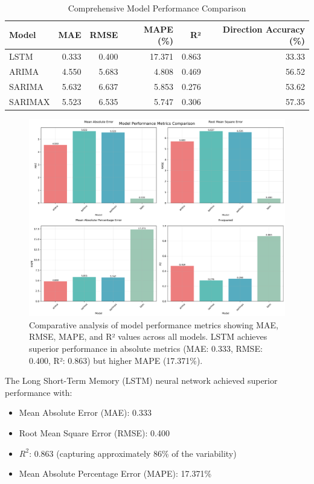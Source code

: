 \documentclass[12pt,a4paper]{report}
\begin{document}
\begin{table}[htbp]
\centering
\caption{Comprehensive Model Performance Comparison}
\label{tab:model_performance}
\begin{tabular}{lrrrrr}
\toprule
Model & MAE & RMSE & MAPE (\%) & R² & Direction Accuracy (\%) \\
\midrule
LSTM & 0.333 & 0.400 & 17.371 & 0.863 & 33.33 \\
ARIMA & 4.550 & 5.683 & 4.808 & 0.469 & 56.52 \\
SARIMA & 5.632 & 6.637 & 5.853 & 0.276 & 53.62 \\
SARIMAX & 5.523 & 6.535 & 5.747 & 0.306 & 57.35 \\
\bottomrule
\end{tabular}
\end{table}

\begin{figure}[htbp]
    \centering
    \includegraphics[width=\textwidth]{model_metrics_comparison}
    \caption{Comparative analysis of model performance metrics showing MAE, RMSE, MAPE, and R² values across all models. LSTM achieves superior performance in absolute metrics (MAE: 0.333, RMSE: 0.400, R²: 0.863) but higher MAPE (17.371\%).}
    \label{fig:model_metrics}
\end{figure}

The Long Short-Term Memory (LSTM) neural network achieved superior performance with:
\begin{itemize}
    \item Mean Absolute Error (MAE): 0.333
    \item Root Mean Square Error (RMSE): 0.400
    \item $R^2$: 0.863 (capturing approximately 86\% of the variability)
    \item Mean Absolute Percentage Error (MAPE): 17.371\%
\end{itemize}
\end{document}

